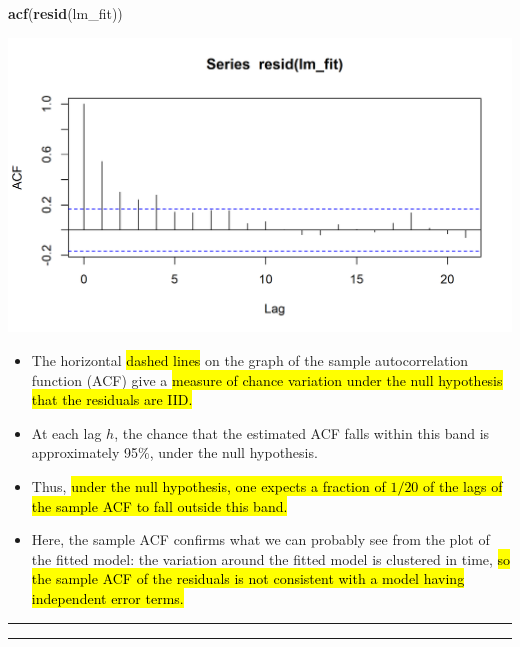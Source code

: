 \documentclass[]{article}
\newenvironment{Shaded}{\begin{snugshade}}{\end{snugshade}}
\newcommand{\KeywordTok}[1]{\textcolor[rgb]{0.13,0.29,0.53}{\textbf{#1}}}
\newcommand{\NormalTok}[1]{#1}
\begin{document}
\begin{Shaded}
\begin{Highlighting}[]
\KeywordTok{acf}\NormalTok{(}\KeywordTok{resid}\NormalTok{(lm_fit))}
\end{Highlighting}
\end{Shaded}

\begin{center}\includegraphics{figure/intro-acf_global_temp-1} \end{center}

\begin{itemize}
\item
  The horizontal \hl{dashed lines} on the graph of the sample autocorrelation
  function (ACF) give a \hl{measure of chance variation under the null
  hypothesis that the residuals are IID.}
\item
  At each lag \(h\), the chance that the estimated ACF falls within this
  band is approximately 95\%, under the null hypothesis.
\item
  Thus, \hl{under the null hypothesis, one expects a fraction of $1/20$ of
  the lags of the sample ACF to fall outside this band.}
\item
  Here, the sample ACF confirms what we can probably see from the plot
  of the fitted model: the variation around the fitted model is
  clustered in time, \hl{so the sample ACF of the residuals is not
  consistent with a model having independent error terms.}
\end{itemize}

\begin{center}\rule{0.5\linewidth}{\linethickness}\end{center}

\begin{center}\rule{0.5\linewidth}{\linethickness}\end{center}
\end{document}
